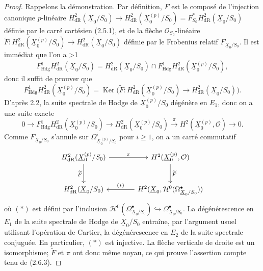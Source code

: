 \documentclass[10pt]{article}
\DeclareMathOperator{\Ker}{Ker}
\newcommand{\Hdg}{\mathrm{Hdg}}
\newcommand{\UX}{\underline{X}}
\newcommand{\DPage}[2]{\ifnum#1>1\clearpage\fi\setcounter{page}{#2}}
\begin{document}
\begin{proof}
Rappelons la démonstration. Par définition, $F$ est le composé de l'injection canonique $p$-linéaire
$H^2_{\mathrm{dR}}(\UX_0/S_0)\to H^2_{\mathrm{dR}}(\UX_0^{(p)}/S_0)=F_{S_0}^*H^2_{\mathrm{dR}}(\UX_0/S_0)$ définie par le carré cartésien (2.5.1), et de la flèche $\mathcal O_{S_0}$-linéaire
$\widetilde F:H^2_{\mathrm{dR}}(\UX_0^{(p)}/S_0)\to H^2_{\mathrm{dR}}(\UX_0/S_0)$ définie par le Frobenius relatif $F_{\UX_0/S_0}$. Il est immédiat que l'on a
\DPage{14}{71}
\[
F^1_{\Hdg}H^2_{\mathrm{dR}}(\UX_0/S_0)=
H^2_{\mathrm{dR}}(\UX_0/S_0)\cap F^1_{\Hdg}H^2_{\mathrm{dR}}(\UX_0^{(p)}/S_0),
\]
donc il suffit de prouver que
\begin{equation}\tag{2.6.2}\label{eq:2.6.2}
F^1_{\Hdg}H^2_{\mathrm{dR}}(\UX_0^{(p)}/S_0)
=\Ker\bigl(\widetilde F:H^2_{\mathrm{dR}}(\UX_0^{(p)}/S_0)\to H^2_{\mathrm{dR}}(\UX_0/S_0)\bigr).
\end{equation}
D'après 2.2, la suite spectrale de Hodge de $\UX_0^{(p)}/S_0$ dégénère en $E_1$, donc on a une suite exacte
\begin{equation}\tag{2.6.3}\label{eq:2.6.3}
0\to F^1_{\Hdg}H^2_{\mathrm{dR}}(\UX_0^{(p)}/S_0)\to H^2_{\mathrm{dR}}(\UX_0^{(p)}/S_0)
\xrightarrow{\pi}H^2(\UX_0^{(p)},\mathcal O)\to0.
\end{equation}
Comme $F_{\UX_0/S_0}$ s'annule sur $\Omega^i_{\UX_0^{(p)}/S_0}$ pour $i\geq1$, on a un carré commutatif
\[
\begin{tikzcd}[column sep=large,row sep=large]
H^2_{\mathrm{dR}}(\UX_0^{(p)}/S_0)\arrow[r,"\pi"]\arrow[d,"\widetilde F"']&H^2(\UX_0^{(p)},\mathcal O)\arrow[d,"\widetilde F"]\\
H^2_{\mathrm{dR}}(\UX_0/S_0)&H^2(\UX_0,\mathcal H^0(\Omega^\bullet_{\UX_0/S_0}))\arrow[l,"(*)"']
\end{tikzcd}
\]
où $(*)$ est défini par l'inclusion $\mathcal H^0(\Omega^\bullet_{\UX_0/S_0})\hookrightarrow\Omega^\bullet_{\UX_0/S_0}$. La dégénérescence en $E_1$ de la suite spectrale de Hodge de $\UX_0/S_0$ entraîne, par l'argument usuel utilisant l'opération de Cartier, la dégénérescence en $E_2$ de la suite spectrale conjuguée. En particulier, $(*)$ est injective. La flèche verticale de droite est un isomorphisme; $\widetilde F$ et $\pi$ ont donc même noyau, ce qui prouve l'assertion compte tenu de (2.6.3).
\end{proof}
\end{document}
